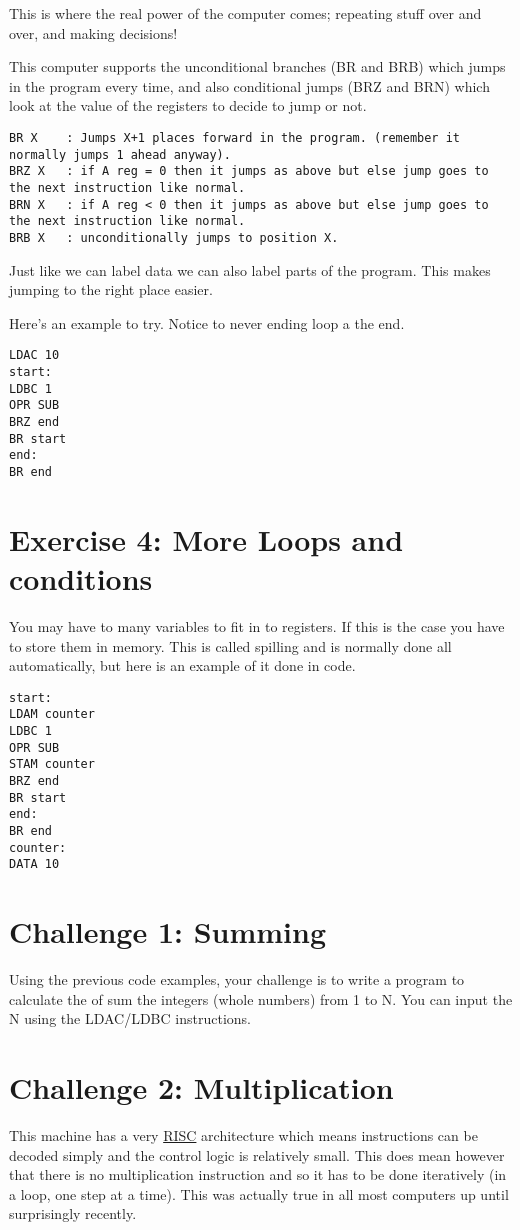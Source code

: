 \documentclass[10pt,a4paper]{article}
\begin{document}
This is where the real power of the computer comes; repeating stuff over and over, and making decisions!

This computer supports the unconditional branches (BR and BRB) which jumps in the program every time, and also conditional jumps (BRZ and BRN) which look at the value of the registers to decide to jump or not.
\begin{verbatim}
BR X	: Jumps X+1 places forward in the program. (remember it normally jumps 1 ahead anyway).
BRZ X 	: if A reg = 0 then it jumps as above but else jump goes to the next instruction like normal.
BRN X	: if A reg < 0 then it jumps as above but else jump goes to the next instruction like normal.
BRB X	: unconditionally jumps to position X.
\end{verbatim}

Just like we can label data we can also label parts of the program. This makes jumping to the right place easier.

Here's an example to try. Notice to never ending loop a the end.
\begin{lstlisting}[frame=single]
LDAC 10
start:
LDBC 1
OPR SUB
BRZ end
BR start
end:
BR end
\end{lstlisting}

\section{Exercise 4: More Loops and conditions}
You may have to many variables to fit in to registers. If this is the case you have to store them in memory. This is called spilling and is normally done all automatically, but here is an example of it done in code.

\begin{lstlisting}[frame=single]
start:
LDAM counter
LDBC 1
OPR SUB
STAM counter
BRZ end
BR start
end:
BR end
counter:
DATA 10
\end{lstlisting}

\section{Challenge 1: Summing}
Using the previous code examples, your challenge is to write a program to calculate the of sum the integers (whole numbers) from 1 to N. You can input the N using the LDAC/LDBC instructions.

\section{Challenge 2: Multiplication}
This machine has a very \href{https://en.wikipedia.org/wiki/Reduced_instruction_set_computing}{RISC} architecture which means instructions can be decoded simply and the control
logic is relatively small. This does mean however that there is no multiplication instruction and so it has to be
done iteratively (in a loop, one step at a time). This was actually true in all most computers up until surprisingly recently.
\end{document}
